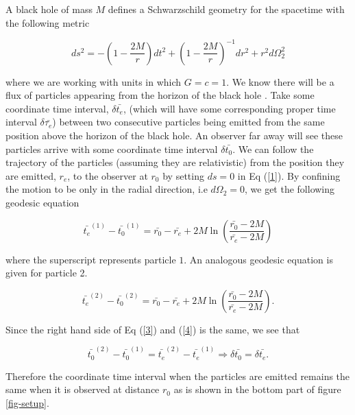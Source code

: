 \documentclass[aps,showpacs,twocolumn,floats,prd,superscriptaddress,nofootinbib]{revtex4-1}
\begin{document}
A black hole of mass $M$ defines a Schwarzschild geometry for the spacetime with the following metric 

\begin{equation}
	ds^2 = - \left( 1 -\frac{2M}{r} \right) dt^2 + \left( 1 - \frac{2M}{r} \right)^{-1} dr^2 + r^2 d \Omega_2^2	\label{1}
\end{equation}

where we are working with units in which $G = c = 1$. We know there will be a flux of particles appearing from the horizon of the black hole \cite{Haw74}. Take some coordinate time interval, $\delta \bar{t_e}$, (which will have some corresponding proper time interval $\delta \bar{\tau_e}$) between two consecutive particles being emitted from the same position above the horizon of the black hole. An observer far away will see these particles arrive with some coordinate time interval $\delta \bar{t_0}$. We can follow the trajectory of the particles (assuming they are relativistic) from the position they are emitted, $r_e$, to the observer at $r_0$ by setting $ds = 0$ in Eq (\ref{1}). By confining the motion to be only in the radial direction, i.e $d \Omega_2 = 0$, we get the following geodesic equation

\begin{equation}
	\bar{t_e}^{(1)} - \bar{t_0}^{(1)} = \bar{r_0} - \bar{r_e} + 2M \ln \left( \frac{\bar{r_0} - 2M}{\bar{r_e} - 2M}  \right)	\label{3}
\end{equation}

where the superscript represents particle $1$. An analogous geodesic equation is given for particle 2. 

\begin{equation}
	\bar{t_e}^{(2)} - \bar{t_0}^{(2)} = \bar{r_0} - \bar{r_e} + 2M \ln \left( \frac{\bar{r_0} - 2M}{\bar{r_e} - 2M}  \right).	\label{4}
\end{equation}

Since the right hand side of Eq (\ref{3}) and (\ref{4}) is the same, we see that

\begin{equation}
	\bar{t_0}^{(2)} - \bar{t_0}^{(1)} = \bar{t_e}^{(2)} - \bar{t_e}^{(1)} \Rightarrow \delta \bar{t_0} = \delta \bar{t_e}.
\end{equation}

Therefore the coordinate time interval when the particles are emitted remains the same when it is observed at distance $r_0$ as is shown in the bottom part of figure \ref{fig-setup}.
\end{document}
